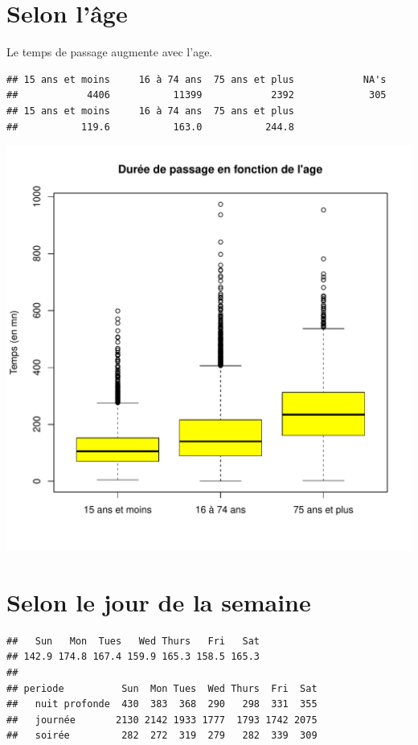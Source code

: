 \documentclass[12pt,english,french,twoside]{report}\usepackage[]{graphicx}\usepackage[]{color}
\makeatletter
\def\maxwidth{ %
  \ifdim\Gin@nat@width>\linewidth
    \linewidth
  \else
    \Gin@nat@width
  \fi
}
\newenvironment{kframe}{%
 \def\at@end@of@kframe{}%
 \ifinner\ifhmode%
  \def\at@end@of@kframe{\end{minipage}}%
  \begin{minipage}{\columnwidth}%
 \fi\fi%
 \def\FrameCommand##1{\hskip\@totalleftmargin \hskip-\fboxsep
 \colorbox{shadecolor}{##1}\hskip-\fboxsep
     \hskip-\linewidth \hskip-\@totalleftmargin \hskip\columnwidth}%
 \MakeFramed {\advance\hsize-\width
   \@totalleftmargin\z@ \linewidth\hsize
   \@setminipage}}%
 {\par\unskip\endMakeFramed%
 \at@end@of@kframe}
\newenvironment{knitrout}{}{} %
\makeatother
\begin{document}
\begin{knitrout}
\end{knitrout}



\section*{Selon l'âge}

Le temps de passage augmente avec l'age.
\begin{knitrout}
\color{fgcolor}\begin{kframe}
\begin{verbatim}
## 15 ans et moins     16 à 74 ans  75 ans et plus            NA's 
##            4406           11399            2392             305
## 15 ans et moins     16 à 74 ans  75 ans et plus 
##           119.6           163.0           244.8
\end{verbatim}
\end{kframe}
\includegraphics[width=\maxwidth]{figure/duree_age} 

\end{knitrout}


\section*{Selon le jour de la semaine}
\begin{knitrout}
\color{fgcolor}\begin{kframe}
\begin{verbatim}
##   Sun   Mon  Tues   Wed Thurs   Fri   Sat 
## 142.9 174.8 167.4 159.9 165.3 158.5 165.3
##                
## periode          Sun  Mon Tues  Wed Thurs  Fri  Sat
##   nuit profonde  430  383  368  290   298  331  355
##   journée       2130 2142 1933 1777  1793 1742 2075
##   soirée         282  272  319  279   282  339  309
\end{verbatim}
\end{kframe}
\end{knitrout}
\end{document}

